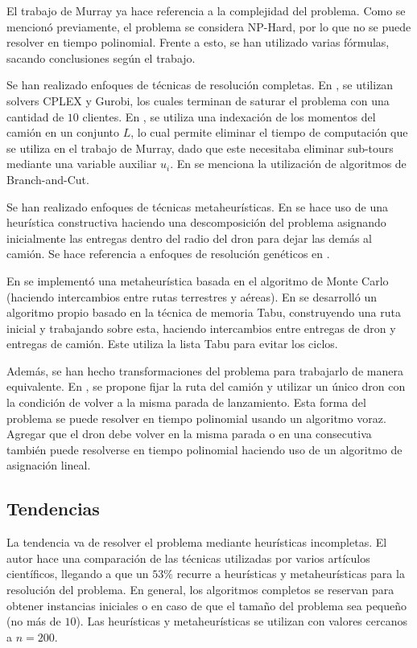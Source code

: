 El trabajo de Murray ya hace referencia a la complejidad del problema. Como se mencionó previamente, el problema se considera NP-Hard, por lo que no se puede resolver en tiempo polinomial. Frente a esto, se han utilizado varias fórmulas, sacando conclusiones según el trabajo.

Se han realizado enfoques de técnicas de resolución completas. En \cite{Murray2015Flying}, se utilizan solvers CPLEX y Gurobi, los cuales terminan de saturar el problema con una cantidad de $10$ clientes. En \cite{freitas2021exact}, se utiliza una indexación de los momentos del camión en un conjunto $L$, lo cual permite eliminar el tiempo de computación que se utiliza en el trabajo de Murray, dado que este necesitaba eliminar sub-tours mediante una variable auxiliar $u_i$. En \cite{moshrefjavadi2021applications} se menciona la utilización de algoritmos de Branch-and-Cut.

Se han realizado enfoques de técnicas metaheurísticas. En \cite{freitas2021exact} se hace uso de una heurística constructiva haciendo una descomposición del problema asignando inicialmente las entregas dentro del radio del dron para dejar las demás al camión. Se hace referencia a enfoques de resolución genéticos en \cite{moshrefjavadi2021applications}.

En \cite{ponza2016optimization} se implementó una metaheurística basada en el algoritmo de Monte Carlo (haciendo intercambios entre rutas terrestres y aéreas). En \cite{freitas2021exact} se desarrolló un algoritmo propio basado en la técnica de memoria Tabu, construyendo una ruta inicial y trabajando sobre esta, haciendo intercambios entre entregas de dron y entregas de camión. Este utiliza la lista Tabu para evitar los ciclos.

Además, se han hecho transformaciones del problema para trabajarlo de manera equivalente. En \cite{boysen2018drone}, se propone fijar la ruta del camión y utilizar un único dron con la condición de volver a la misma parada de lanzamiento. Esta forma del problema se puede resolver en tiempo polinomial usando un algoritmo voraz. Agregar que el dron debe volver en la misma parada o en una consecutiva también puede resolverse en tiempo polinomial haciendo uso de un algoritmo de asignación lineal.

\subsection{Tendencias}

La tendencia va de resolver el problema mediante heurísticas incompletas. El autor \cite{moshrefjavadi2021applications} hace una comparación de las técnicas utilizadas por varios artículos científicos, llegando a que un $53\%$ recurre a heurísticas y metaheurísticas para la resolución del problema. En general, los algoritmos completos se reservan para obtener instancias iniciales o en caso de que el tamaño del problema sea pequeño (no más de $10$). Las heurísticas y metaheurísticas se utilizan con valores cercanos a $n=200$.


